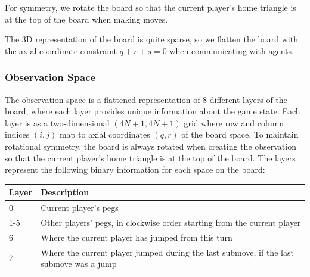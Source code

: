 \documentclass[12pt, a4paper, twocolumn]{article}
\begin{document}

For symmetry, we rotate the board so that the current player's home triangle is at the top of the board when making moves. 
  
The 3D representation of the board is quite sparse, so we flatten the board with the axial coordinate constraint $q + r + s = 0$ when communicating with agents.

\subsubsection{Observation Space}

The observation space is a flattened representation of 8 different layers of the board, where each layer provides unique information about the game state. Each layer is as a two-dimensional $(4N + 1, 4N + 1)$ grid where row and column indices $(i, j)$ map to axial coordinates $(q, r)$ of the board space. To maintain rotational symmetry, the board is always rotated when creating the observation so that the current player's home triangle is at the top of the board. The layers represent the following binary information for each space on the board:

\begin{center}
\begin{tabular}{|m{}|m{}|}
  \hline
  Layer & Description \\
  \hline
  0 & Current player's pegs \\
  1-5 & Other players' pegs, in clockwise order starting from the current player \\
  6 & Where the current player has jumped from this turn \\
  7 & Where the current player jumped during the last submove, if the last submove was a jump \\
  \hline
\end{tabular}
\end{center}
\end{document}
